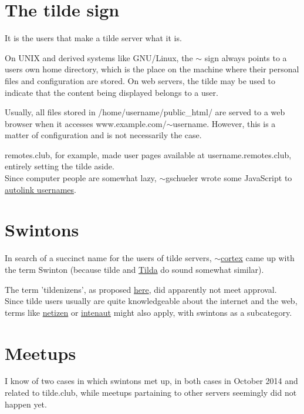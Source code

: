 \section{The tilde sign}
It is the users that make a tilde server what it is.

On UNIX and derived systems like GNU/Linux, the $\sim$ sign always points to a users own home directory, which is the place on the machine where their personal files and configuration are stored. On web servers, the tilde may be used to indicate that the content being displayed belongs to a user.

Usually, all files stored in /home/username/public\_html/ are served to a web browser when it accesses www.example.com/$\sim$username. However, this is a matter of configuration and is not necessarily the case.

remotes.club, for example, made user pages available at username.remotes.club, entirely setting the tilde aside.
\\

Since computer people are somewhat lazy, $\sim$gschueler wrote some JavaScript to \href{http://tilde.club/~gschueler/tildelink.html}{autolink usernames}.

\section{Swintons}
In search of a succinct name for the users of tilde servers, \href{http://tilde.club/~cortex/}{$\sim$cortex} came up with the term Swinton (because tilde and \href{https://en.wikipedia.org/wiki/Tilda_Swinton}{Tilda} do sound somewhat similar).

The term 'tildenizens', as proposed \href{http://tilde.club/~joeld/tildelore.html}{here}, did apparently not meet approval.\\

Since tilde users usually are quite knowledgeable about the internet and the web, terms like \href{https://en.wikipedia.org/wiki/Netizen}{netizen} or \href{https://en.wikipedia.org/wiki/Internaut}{intenaut} might also apply, with swintons as a subcategory.

\section{Meetups}
I know of two cases in which swintons met up, in both cases in October 2014 and related to tilde.club, while meetups partaining to other servers seemingly did not happen yet.\\

